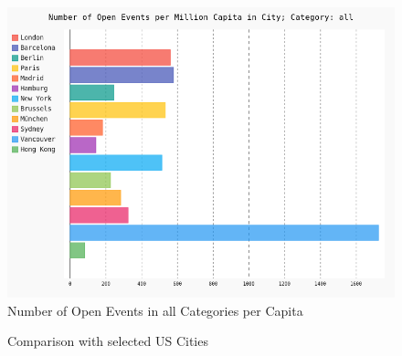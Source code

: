 \begin{figure}[!htp]
	\includegraphics[width=1\linewidth]{../plotting/pngs/activities_per_city_per_capita/all.png}
	\caption{Number of Open Events in all Categories per Capita}\label{fig:categories_all_percapita}	
\end{figure}

\begin{figure}[!htp]
	\hfill
	\caption{Comparison with selected US Cities}\label{fig:usabar}
\end{figure}